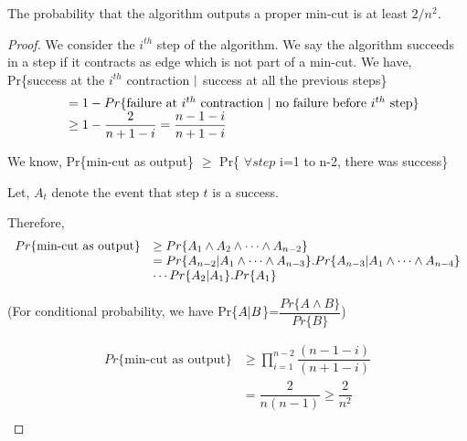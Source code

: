 \begin{theorem}
 The probability that the algorithm outputs a proper min-cut is at least $2/n^{2}$.
\end{theorem}
\begin{proof}
 We consider the $i^{th}$ step of the algorithm. We say the algorithm succeeds in a step if it contracts
as edge which is not part of a min-cut. We have,\\
Pr\{success at the $i^{th}$ contraction $\arrowvert$ success at all the previous steps\}\\
\begin{equation*}
 \begin{array}{ll}
  &= 1 - Pr\{\mbox{failure at $i^{th}$ contraction $\arrowvert$ no failure before $i^{th}$ step}\}\\
  &\geq 1- \dfrac{2}{n + 1 -i} = \dfrac{n-1-i}{n+1-i}\\ 
 \end{array}
\end{equation*}

\noindent We know, Pr\{min-cut as output\} $\geq$ Pr\{ $\forall step$ i=1 to n-2, there was success\}

\noindent Let, $A_{t}$ denote the event that step $t$ is a success.

\noindent Therefore,
\begin{equation*}
 \begin{array}{ll}
    Pr\{\mbox{min-cut as output}\}&\geq Pr\{A_{1} \wedge A_{2} \wedge \cdots \wedge A_{n-2}\}\\
    &= Pr\{A_{n-2}\arrowvert A_{1} \wedge \cdots \wedge A_{n-3}\}.Pr\{A_{n-3}\arrowvert A_{1} \wedge\cdots \wedge A_{n-4}\}\\
    &  \cdots Pr\{A_{2}\arrowvert A_{1}\} . Pr\{A_{1}\}\\
  \end{array}
\end{equation*}

\noindent(For conditional probability, we have
Pr\{$A\arrowvert B$\}=$\dfrac{Pr\{A\wedge B\}}{Pr\{B\}}$)

\begin{equation*}
 \begin{array}{ll}
    Pr\{\mbox{min-cut as output}\}&\geq \displaystyle\prod_{i=1}^{n-2} \dfrac{(n-1-i)}{(n+1-i)}\\
    &= \dfrac{2}{n(n-1)} \geq \dfrac{2}{n^{2}}\\
  \end{array}
\end{equation*}

\end{proof}

